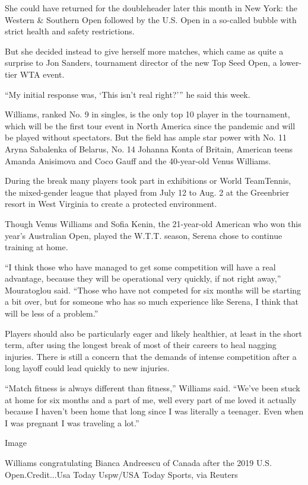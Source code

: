 She could have returned for the doubleheader later this month in New
York: the Western \& Southern Open followed by the U.S. Open in a
so-called bubble with strict health and safety restrictions.

But she decided instead to give herself more matches, which came as
quite a surprise to Jon Sanders, tournament director of the new Top Seed
Open, a lower-tier WTA event.

``My initial response was, `This isn't real right?''' he said this week.

Williams, ranked No. 9 in singles, is the only top 10 player in the
tournament, which will be the first tour event in North America since
the pandemic and will be played without spectators. But the field has
ample star power with No. 11 Aryna Sabalenka of Belarus, No. 14 Johanna
Konta of Britain, American teens Amanda Anisimova and Coco Gauff and the
40-year-old Venus Williams.

During the break many players took part in exhibitions or World
TeamTennis, the mixed-gender league that played from July 12 to Aug. 2
at the Greenbrier resort in West Virginia to create a protected
environment.

Though Venus Williams and Sofia Kenin, the 21-year-old American who won
this year's Australian Open, played the W.T.T. season, Serena chose to
continue training at home.

``I think those who have managed to get some competition will have a
real advantage, because they will be operational very quickly, if not
right away,'' Mouratoglou said. ``Those who have not competed for six
months will be starting a bit over, but for someone who has so much
experience like Serena, I think that will be less of a problem.''

Players should also be particularly eager and likely healthier, at least
in the short term, after using the longest break of most of their
careers to heal nagging injuries. There is still a concern that the
demands of intense competition after a long layoff could lead quickly to
new injuries.

``Match fitness is always different than fitness,'' Williams said.
``We've been stuck at home for six months and a part of me, well every
part of me loved it actually because I haven't been home that long since
I was literally a teenager. Even when I was pregnant I was traveling a
lot.''

Image

Williams congratulating Bianca Andreescu of Canada after the 2019 U.S.
Open.Credit...Usa Today Uspw/USA Today Sports, via Reuters

